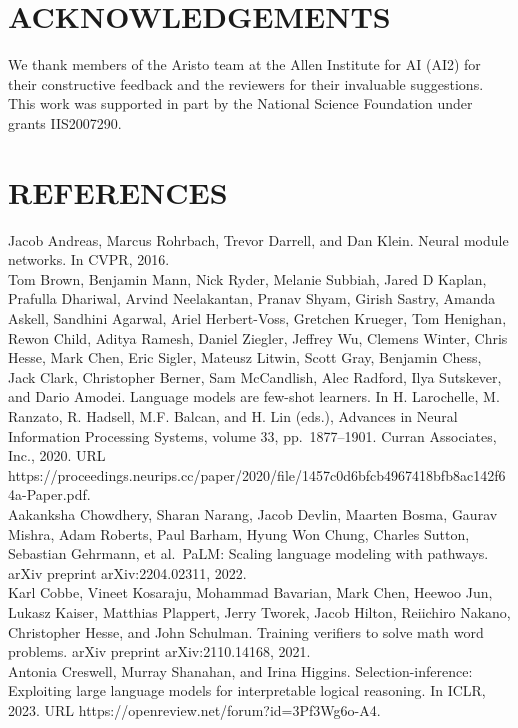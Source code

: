 \documentclass[
]{article}
\begin{document}
\section{ACKNOWLEDGEMENTS}\label{acknowledgements}

We thank members of the Aristo team at the Allen Institute for AI (AI2)
for their constructive feedback and the reviewers for their invaluable
suggestions. This work was supported in part by the National Science
Foundation under grants IIS2007290.

\section{REFERENCES}\label{references}

Jacob Andreas, Marcus Rohrbach, Trevor Darrell, and Dan Klein. Neural
module networks. In CVPR, 2016.\\
Tom Brown, Benjamin Mann, Nick Ryder, Melanie Subbiah, Jared D Kaplan,
Prafulla Dhariwal, Arvind Neelakantan, Pranav Shyam, Girish Sastry,
Amanda Askell, Sandhini Agarwal, Ariel Herbert-Voss, Gretchen Krueger,
Tom Henighan, Rewon Child, Aditya Ramesh, Daniel Ziegler, Jeffrey Wu,
Clemens Winter, Chris Hesse, Mark Chen, Eric Sigler, Mateusz Litwin,
Scott Gray, Benjamin Chess, Jack Clark, Christopher Berner, Sam
McCandlish, Alec Radford, Ilya Sutskever, and Dario Amodei. Language
models are few-shot learners. In H. Larochelle, M. Ranzato, R. Hadsell,
M.F. Balcan, and H. Lin (eds.), Advances in Neural Information
Processing Systems, volume 33, pp.~1877--1901. Curran Associates, Inc.,
2020. URL
https://proceedings.neurips.cc/paper/2020/file/1457c0d6bfcb4967418bfb8ac142f64a-Paper.pdf.\\
Aakanksha Chowdhery, Sharan Narang, Jacob Devlin, Maarten Bosma, Gaurav
Mishra, Adam Roberts, Paul Barham, Hyung Won Chung, Charles Sutton,
Sebastian Gehrmann, et al.~PaLM: Scaling language modeling with
pathways. arXiv preprint arXiv:2204.02311, 2022.\\
Karl Cobbe, Vineet Kosaraju, Mohammad Bavarian, Mark Chen, Heewoo Jun,
Lukasz Kaiser, Matthias Plappert, Jerry Tworek, Jacob Hilton, Reiichiro
Nakano, Christopher Hesse, and John Schulman. Training verifiers to
solve math word problems. arXiv preprint arXiv:2110.14168, 2021.\\
Antonia Creswell, Murray Shanahan, and Irina Higgins.
Selection-inference: Exploiting large language models for interpretable
logical reasoning. In ICLR, 2023. URL
https://openreview.net/forum?id=3Pf3Wg6o-A4.\\
\end{document}
